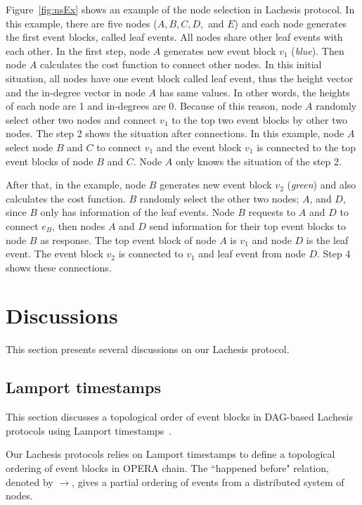 \documentclass[preprint,12pt]{elsarticle}
\begin{document}
Figure~\ref{fig:nsEx} shows an example of the node selection in Lachesis protocol. In this example, there are five nodes ($A, B, C, D,$ and $E$) and each node generates the first event blocks, called leaf events. All nodes share other leaf events with each other. In the first step, node $A$ generates new event block $v_1$ (\textit{blue}). Then node $A$ calculates the cost function to connect other nodes. In this initial situation, all nodes have one event block called leaf event, thus the height vector and the in-degree vector in node $A$ has same values. In other words, the heights of each node are 1 and in-degrees are 0. Because of this reason, node $A$ randomly select other two nodes and connect $v_1$ to the top two event blocks by other two nodes. The step 2 shows the situation after connections. In this example, node $A$ select node $B$ and $C$ to connect $v_1$ and the event block $v_1$ is connected to the top event blocks of node $B$ and $C$. Node $A$ only knows the situation of the step 2. 

After that, in the example, node $B$ generates new event block $v_2$ (\textit{green}) and also calculates the cost function. $B$ randomly select the other two nodes; $A$, and $D$, since $B$ only has information of the leaf events. Node $B$ requests to $A$ and $D$ to connect $e_B$, then nodes $A$ and $D$ send information for their top event blocks to node $B$ as response. The top event block of node $A$ is $v_1$ and node $D$ is the leaf event. The event block $v_2$ is connected to $v_1$ and leaf event from node $D$. Step 4 shows these connections. 



\section{Discussions }\label{se:discuss}
This section presents several discussions on our Lachesis protocol.

\subsection{Lamport timestamps}
This section discusses a topological order of event blocks in DAG-based Lachesis protocols using Lamport timestamps~\cite{lamport1978time}.

Our Lachesis protocols relies on Lamport timestamps to define a topological ordering of event blocks in OPERA chain.
The ``happened before" relation, denoted by $\rightarrow$, gives a partial ordering of events from a distributed system of nodes. 
\end{document}
